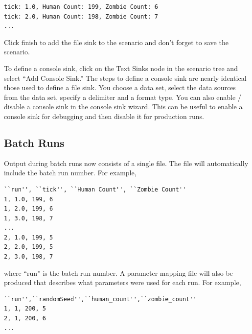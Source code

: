 \documentclass[11pt]{amsart}
\begin{document}
\noindent\begin{minipage}[h]{\textwidth}
\vspace{.2in}
\lstset{language=java,caption=Line Output}
\begin{lstlisting}
tick: 1.0, Human Count: 199, Zombie Count: 6
tick: 2.0, Human Count: 198, Zombie Count: 7
...
\end{lstlisting}
\vspace{.2in}
\end{minipage}

Click finish to add the file sink to the scenario and don't forget to save the scenario.

To define a console sink, click on the Text Sinks node in the scenario tree and select ``Add Console Sink.'' The steps to define a console sink are nearly identical those used to define a file sink. You choose a data set, select the data sources from the data set, specify a delimiter and a format type. You can also enable / disable a console sink in the console sink wizard. This can be useful to enable a console sink for debugging and then disable it for production runs.

\subsection{Batch Runs}
Output during batch runs now consists of a single file. The file will automatically include the batch run number. For example,

\noindent\begin{minipage}[h]{\textwidth}
\vspace{.2in}
\lstset{language=java,caption=Batch Run Output}
\begin{lstlisting}
``run'', ``tick'', ``Human Count'', ``Zombie Count''
1, 1.0, 199, 6
1, 2.0, 199, 6
1, 3.0, 198, 7
...
2, 1.0, 199, 5
2, 2.0, 199, 5
2, 3.0, 198, 7

\end{lstlisting}
\vspace{.2in}
\end{minipage}

where ``run'' is the batch run number. A parameter mapping file will also be produced that describes what parameters were used for each run. For example,

\noindent\begin{minipage}[h]{\textwidth}
\vspace{.2in}
\lstset{language=java,caption=Batch Parameter Map Output}
\begin{lstlisting}
``run'',``randomSeed'',``human_count'',``zombie_count''
1, 1, 200, 5
2, 1, 200, 6
...
\end{lstlisting}
\vspace{.2in}
\end{minipage}
\end{document}
